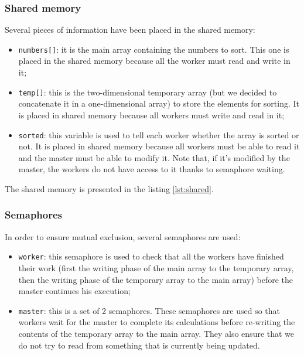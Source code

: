\documentclass[a4paper, 12pt]{article}
\begin{document}
	\subsubsection{Shared memory}
	Several pieces of information have been placed in the shared memory:
	
	\begin{itemize}
	    \item \texttt{numbers[]}: it is the main array containing the numbers to sort. This one is placed in the shared memory because all the worker must read and write in it;
	    \item \texttt{temp[]}: this is the two-dimensional temporary array (but we decided to concatenate it in a one-dimensional array) to store the elements for sorting. It is placed in shared memory because all workers must write and read in it;
	    \item \texttt{sorted}: this variable is used to tell each worker whether the array is sorted or not. It is placed in shared memory because all workers must be able to read it and the master must be able to modify it. Note that, if it's modified by the master, the workers do not have access to it thanks to semaphore waiting.
	\end{itemize}
	
	The shared memory is presented in the listing \ref{lst:shared}.\par
	
	
	
	\subsubsection{Semaphores}
	In order to ensure mutual exclusion, several semaphores are used:
	
	\begin{itemize}
	    \item \texttt{worker}: this semaphore is used to check that all the workers have finished their work (first the writing phase of the main array to the temporary array, then the writing phase of the temporary array to the main array) before the master continues his execution;
	    \item \texttt{master}: this is a set of 2 semaphores. These semaphores are used so that workers wait for the master to complete its calculations before re-writing the contents of the temporary array to the main array. They also ensure that we do not try to read from something that is currently being updated.
	\end{itemize}
	
\end{document}
